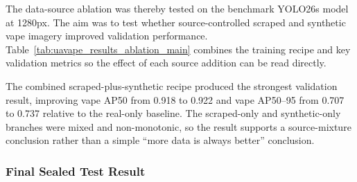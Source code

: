 The data-source ablation was thereby tested on the benchmark YOLO26s model at 1280px. The aim was to test whether source-controlled scraped and synthetic vape imagery improved validation performance. Table~\ref{tab:uavape_results_ablation_main} combines the training recipe and key validation metrics so the effect of each source addition can be read directly.

\begin{table}[H]
\centering
\scriptsize
{}
\caption{Validation results from the V4 data-source ablation under the fixed YOLO26s@1280 protocol.}
\label{tab:uavape_results_ablation_main}
\end{table}

The combined scraped-plus-synthetic recipe produced the strongest validation result, improving vape AP50 from 0.918 to 0.922 and vape AP50--95 from 0.707 to 0.737 relative to the real-only baseline. The scraped-only and synthetic-only branches were mixed and non-monotonic, so the result supports a source-mixture conclusion rather than a simple ``more data is always better'' conclusion.

\subsubsection{Final Sealed Test Result}

